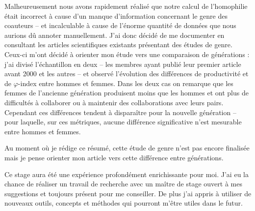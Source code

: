 	Malheureusement nous avons rapidement réalisé que notre calcul de l'homophilie était incorrect à cause d'un manque d'information concernant le genre des coauteurs -- et incalculable à cause de l'énorme quantité de données que nous aurions dû annoter manuellement. J'ai donc décidé de me documenter en consultant les articles scientifiques existants présentant des études de genre. Ceux-ci m'ont décidé à orienter mon étude vers une comparaison de générations : j'ai divisé l'échantillon en deux -- les membres ayant publié leur premier article avant 2000 et les autres -- et observé l'évolution des différences de productivité et de $\varphi$-index entre hommes et femmes. Dans les deux cas on remarque que les femmes de l'ancienne génération produisent moins que les hommes et ont plus de difficultés à collaborer ou à maintenir des collaborations avec leurs pairs. Cependant ces différences tendent à disparaître pour la nouvelle génération -- pour laquelle, sur ces métriques, aucune différence significative n'est mesurable entre hommes et femmes.
	
	Au moment où je rédige ce résumé, cette étude de genre n'est pas encore finalisée mais je pense orienter mon article vers cette différence entre générations.
	
	
	
	Ce stage aura été une expérience profondément enrichissante pour moi. J'ai eu la chance de réaliser un travail de recherche avec un maître de stage ouvert à mes suggestions et toujours présent pour me conseiller. De plus j'ai appris à utiliser de nouveaux outils, concepts et méthodes qui pourront m'être utiles dans le futur.
	
	